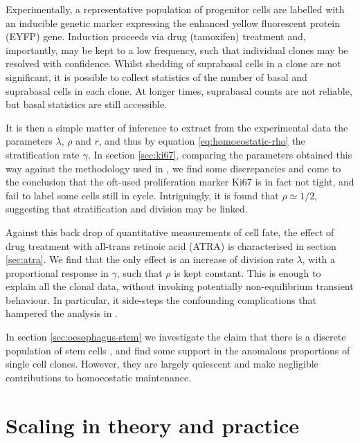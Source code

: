 \documentclass[10pt,english]{report}
\begin{document}
Experimentally, a representative population of progenitor cells are labelled with an inducible genetic marker expressing the enhanced yellow fluorescent protein (EYFP) gene. Induction proceeds via drug (tamoxifen) treatment and, importantly, may be kept to a low frequency, such that individual clones may be resolved with confidence. Whilst shedding of suprabasal cells in a clone are not significant, it is possible to collect statistics of the number of basal and suprabasal cells in each clone. At longer times, suprabasal counts are not reliable, but basal statistics are still accessible.

It is then a simple matter of inference to extract from the experimental data the parameters $\lambda$, $\rho$ and $r$, and thus by equation \eqref{eq:homoeostatic-rho} the stratification rate $\gamma$. In section \ref{sec:ki67}, comparing the parameters obtained this way against the methodology used in \citet{clayton}, we find some discrepancies and come to the conclusion that the oft-used proliferation marker Ki67 is in fact not tight, and fail to label some cells still in cycle. Intriguingly, it is found that $\rho \simeq 1/2$, suggesting that stratification and division may be linked.

Against this back drop of quantitative measurements of cell fate, the effect of drug treatment with all-trans retinoic acid (ATRA) is characterised in section \ref{sec:atra}. We find that the only effect is an increase of division rate $\lambda$, with a proportional response in $\gamma$, such that $\rho$ is kept constant. This is enough to explain all the clonal data, without invoking potentially non-equilibrium transient behaviour. In particular, it side-steps the confounding complications that hampered the analysis in \citet[][chapter 4]{kleinthesis}.

In section \ref{sec:oesophagus-stem} we investigate the claim that there is a discrete population of stem cells \citep{kabalis}, and find some support in the anomalous proportions of single cell clones. However, they are largely quiescent and make negligible contributions to homoeostatic maintenance.

\section{Scaling in theory and practice}
\end{document}
